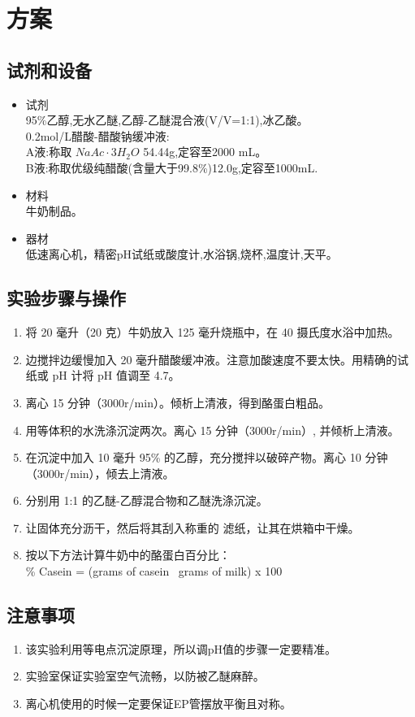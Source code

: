 \documentclass[UTF8]{ctexart}
\begin{document}
\section{方案}

\subsection{试剂和设备}
\begin{itemize}
    \item 试剂 \\
    95\%乙醇,无水乙醚,乙醇-乙醚混合液(V/V=1:1),冰乙酸。\\
    0.2mol/L醋酸-醋酸钠缓冲液:\\
A液:称取 $NaAc\cdot 3H_2O$ 54.44g,定容至2000 mL。\\
B液:称取优级纯醋酸(含量大于99.8\%)12.0g,定容至1000mL.
    \item 材料\\
    牛奶制品。
    \item 器材\\
    低速离心机，精密pH试纸或酸度计,水浴锅,烧杯,温度计,天平。
\end{itemize}

\subsection{实验步骤与操作}
\begin{enumerate}
    \item 将 20 毫升（20 克）牛奶放入 125 毫升烧瓶中，在 40 摄氏度水浴中加热。
    \item 边搅拌边缓慢加入 20 毫升醋酸缓冲液。注意加酸速度不要太快。用精确的试纸或 pH 计将 pH 值调至 4.7。
    \item 离心 15 分钟（3000r/min）。倾析上清液，得到酪蛋白粗品。
    \item 用等体积的水洗涤沉淀两次。离心 15 分钟（3000r/min）, 并倾析上清液。
    \item 在沉淀中加入 10 毫升 95\% 的乙醇，充分搅拌以破碎产物。离心 10 分钟（3000r/min），倾去上清液。
    \item 分别用 1:1 的乙醚-乙醇混合物和乙醚洗涤沉淀。
    \item 让固体充分沥干，然后将其刮入称重的 滤纸，让其在烘箱中干燥。  
    \item 按以下方法计算牛奶中的酪蛋白百分比：\\
    \% Casein =  (grams of casein \ grams of milk) x 100
\end{enumerate}
\subsection{注意事项}
\begin{enumerate}
    \item 该实验利用等电点沉淀原理，所以调pH值的步骤一定要精准。
    \item 实验室保证实验室空气流畅，以防被乙醚麻醉。
    \item 离心机使用的时候一定要保证EP管摆放平衡且对称。
\end{enumerate}
\end{document}
